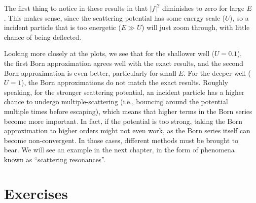 \documentclass[pra,12pt]{revtex4}
\begin{document}
The first thing to notice in these results in that $|f|^2$ diminishes
to zero for large $E$.  This makes sense, since the scattering
potential has some energy scale ($U$), so a incident particle that is
too energetic ($E \gg U$) will just zoom through, with little chance
of being deflected.

Looking more closely at the plots, we see that for the shallower well
($U = 0.1$), the first Born approximation agrees well with the exact
results, and the second Born approximation is even better,
particularly for small $E$.  For the deeper well ($U = 1$), the Born
approximations do not match the exact results.  Roughly speaking, for
the stronger scattering potential, an incident particle has a higher
chance to undergo multiple-scattering (i.e., bouncing around the
potential multiple times before escaping), which means that higher
terms in the Born series become more important.  In fact, if the
potential is too strong, taking the Born approximation to higher
orders might not even work, as the Born series itself can become
non-convergent.  In those cases, different methods must be brought to
bear.  We will see an example in the next chapter, in the form of
phenomena known as ``scattering resonances''.

\section*{Exercises}
\end{document}
